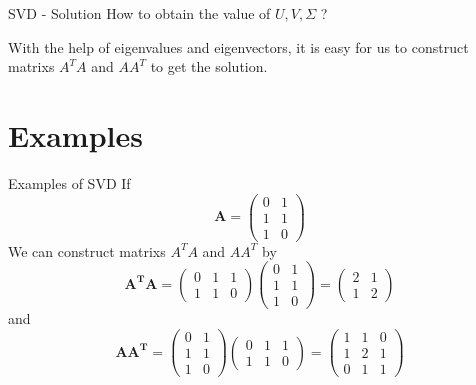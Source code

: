 \documentclass[10pt]{beamer}
\begin{document}
\begin{frame}[fragile]{SVD - Solution}
  How to obtain the value of $U, V, \Sigma$ ?

  With the help of eigenvalues and eigenvectors, it is easy for us to construct matrixs $A^{T}A$ and $AA^{T}$ to get the solution.
\end{frame}

\section{Examples}

\begin{frame}[fragile]{Examples of SVD}
  If $$\mathbf{A} = \left( \begin{array}{ccc} 0& 1\\  1& 1\\   1& 0 \end{array} \right)$$
  We can construct matrixs $A^{T}A$ and $AA^{T}$ by $$\mathbf{A^TA} = \left( \begin{array}{ccc} 0& 1 &1\\ 1&1& 0 \end{array} \right) \left( \begin{array}{ccc} 0& 1\\  1& 1\\   1& 0 \end{array} \right) = \left( \begin{array}{ccc} 2& 1 \\ 1& 2 \end{array} \right)$$
  and $$\mathbf{AA^T} =  \left( \begin{array}{ccc} 0& 1\\  1& 1\\   1& 0 \end{array} \right) \left( \begin{array}{ccc} 0& 1 &1\\ 1&1& 0 \end{array} \right) = \left( \begin{array}{ccc} 1& 1 & 0\\ 1& 2 & 1\\ 0& 1& 1 \end{array} \right)$$
  
\end{frame}
\end{document}
